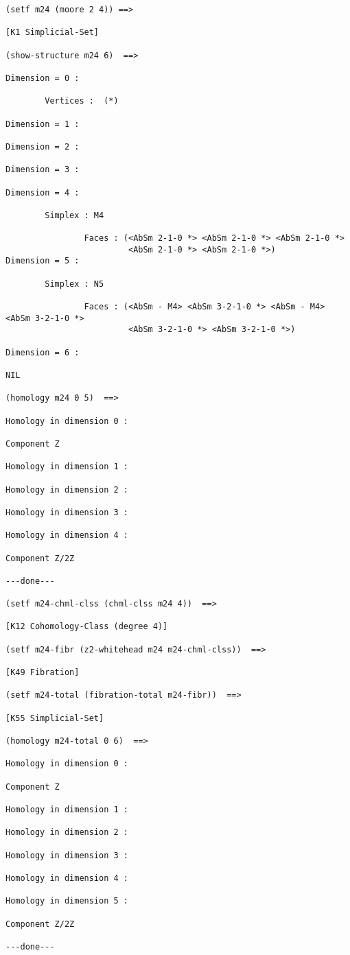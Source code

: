 {\footnotesize\begin{verbatim}
(setf m24 (moore 2 4)) ==>

[K1 Simplicial-Set]

(show-structure m24 6)  ==>

Dimension = 0 :

        Vertices :  (*)

Dimension = 1 :

Dimension = 2 :

Dimension = 3 :

Dimension = 4 :

        Simplex : M4

                Faces : (<AbSm 2-1-0 *> <AbSm 2-1-0 *> <AbSm 2-1-0 *> 
                         <AbSm 2-1-0 *> <AbSm 2-1-0 *>)
Dimension = 5 :

        Simplex : N5

                Faces : (<AbSm - M4> <AbSm 3-2-1-0 *> <AbSm - M4> <AbSm 3-2-1-0 *> 
                         <AbSm 3-2-1-0 *> <AbSm 3-2-1-0 *>)

Dimension = 6 :

NIL

(homology m24 0 5)  ==>

Homology in dimension 0 :

Component Z

Homology in dimension 1 :

Homology in dimension 2 :

Homology in dimension 3 :

Homology in dimension 4 :

Component Z/2Z

---done---

(setf m24-chml-clss (chml-clss m24 4))  ==>

[K12 Cohomology-Class (degree 4)]

(setf m24-fibr (z2-whitehead m24 m24-chml-clss))  ==>

[K49 Fibration]

(setf m24-total (fibration-total m24-fibr))  ==>

[K55 Simplicial-Set]

(homology m24-total 0 6)  ==>

Homology in dimension 0 :

Component Z

Homology in dimension 1 :

Homology in dimension 2 :

Homology in dimension 3 :

Homology in dimension 4 :

Homology in dimension 5 :

Component Z/2Z

---done---
\end{verbatim}}

